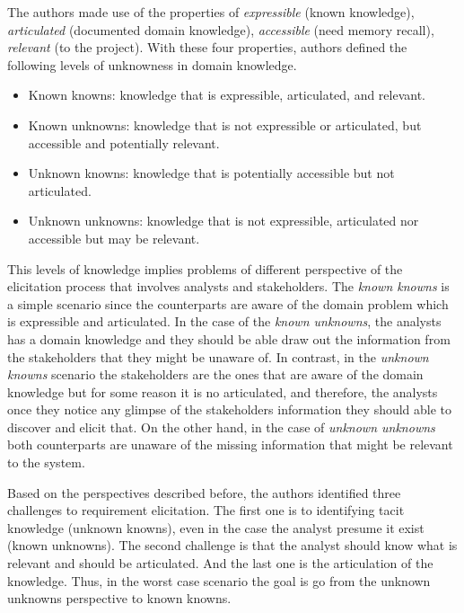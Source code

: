 \documentclass[]{llncs}
\begin{document}
The authors made use of the properties of \emph{expressible} (known
knowledge), \emph{articulated} (documented domain knowledge),
\emph{accessible} (need memory recall), \emph{relevant} (to the
project). With these four properties, authors defined the following
levels of unknowness in domain knowledge.

\begin{itemize}
\tightlist
\item
  Known knowns: knowledge that is expressible, articulated, and
  relevant.
\item
  Known unknowns: knowledge that is not expressible or articulated, but
  accessible and potentially relevant.
\item
  Unknown knowns: knowledge that is potentially accessible but not
  articulated.
\item
  Unknown unknowns: knowledge that is not expressible, articulated nor
  accessible but may be relevant.
\end{itemize}

This levels of knowledge implies problems of different perspective of
the elicitation process that involves analysts and stakeholders. The
\emph{known knowns} is a simple scenario since the counterparts are
aware of the domain problem which is expressible and articulated. In the
case of the \emph{known unknowns}, the analysts has a domain knowledge
and they should be able draw out the information from the stakeholders
that they might be unaware of. In contrast, in the \emph{unknown knowns}
scenario the stakeholders are the ones that are aware of the domain
knowledge but for some reason it is no articulated, and therefore, the
analysts once they notice any glimpse of the stakeholders information
they should able to discover and elicit that. On the other hand, in the
case of \emph{unknown unknowns} both counterparts are unaware of the
missing information that might be relevant to the system.

Based on the perspectives described before, the authors identified three
challenges to requirement elicitation. The first one is to identifying
tacit knowledge (unknown knowns), even in the case the analyst presume
it exist (known unknowns). The second challenge is that the analyst
should know what is relevant and should be articulated. And the last one
is the articulation of the knowledge. Thus, in the worst case scenario
the goal is go from the unknown unknowns perspective to known knowns.
\end{document}
